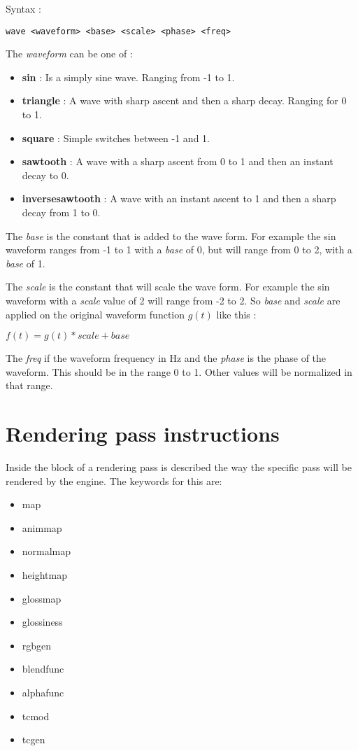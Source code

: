 \documentclass[12pt, titlepage]{amsart}
\begin{document}
Syntax :
\begin{verbatim}
wave <waveform> <base> <scale> <phase> <freq>
\end{verbatim}

The \textit{waveform} can be one of :
\begin{itemize}
\item \textbf{sin} : Is a simply sine wave. Ranging from -1 to 1.
\item \textbf{triangle} : A wave with sharp ascent and then a sharp decay. Ranging for 0 to 1.
\item \textbf{square} : Simple switches between  -1 and 1.
\item \textbf{sawtooth} : A wave with a sharp ascent from 0 to 1 and then an instant decay to 0.
\item \textbf{inversesawtooth} : A wave with an instant ascent to 1 and then a sharp decay from 1 to 0.
\end{itemize}

The \textit{base} is the constant that is added to the wave form. For example the sin waveform
ranges from -1 to 1 with a \textit{base} of 0, but will range from 0 to 2, with a \textit{base}
of 1.

The \textit{scale} is the constant that will scale the wave form. For example the sin waveform
with a \textit{scale} value of 2 will range from -2 to 2. So \textit{base} and \textit{scale}
are applied on the original waveform function $g(t)$ like this :

\begin{center}
$f(t)=g(t)*scale + base$
\end{center}

The \textit{freq} if the waveform frequency in Hz and the \textit{phase} is the phase of the waveform.
This should be in the range 0 to 1. Other values will be normalized in that range.


\section{Rendering pass instructions}
Inside the block of a rendering pass is described the way the specific pass
will be rendered by the engine. The keywords for this are:

\begin{itemize}
\item map
\item animmap
\item normalmap
\item heightmap
\item glossmap
\item glossiness
\item rgbgen
\item blendfunc
\item alphafunc
\item tcmod
\item tcgen
\end{itemize}
\end{document}
